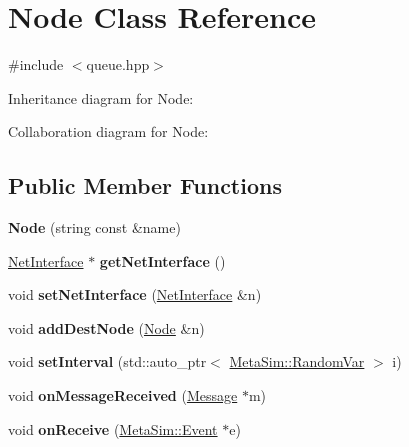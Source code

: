 \hypertarget{classNode}{}\section{Node Class Reference}
\label{classNode}


{\ttfamily \#include $<$queue.\+hpp$>$}



Inheritance diagram for Node\+:


Collaboration diagram for Node\+:
\subsection*{Public Member Functions}
\begin{DoxyCompactItemize}
\item 
{\bfseries Node} (string const \&name)\hypertarget{classNode_a63d040cf5e69258d36138057131e6223}{}\label{classNode_a63d040cf5e69258d36138057131e6223}

\item 
\hyperlink{classNetInterface}{Net\+Interface} $\ast$ {\bfseries get\+Net\+Interface} ()\hypertarget{classNode_a367cc1b357667e0517259a5955fed5d4}{}\label{classNode_a367cc1b357667e0517259a5955fed5d4}

\item 
void {\bfseries set\+Net\+Interface} (\hyperlink{classNetInterface}{Net\+Interface} \&n)\hypertarget{classNode_ad764157ae91279ab80f272f6f2849827}{}\label{classNode_ad764157ae91279ab80f272f6f2849827}

\item 
void {\bfseries add\+Dest\+Node} (\hyperlink{classNode}{Node} \&n)\hypertarget{classNode_aa9ca13bfe768dc01f64a0512345224d8}{}\label{classNode_aa9ca13bfe768dc01f64a0512345224d8}

\item 
void {\bfseries set\+Interval} (std\+::auto\+\_\+ptr$<$ \hyperlink{classMetaSim_1_1RandomVar}{Meta\+Sim\+::\+Random\+Var} $>$ i)\hypertarget{classNode_a373a4311166dcc21eeae3cb68d87d02e}{}\label{classNode_a373a4311166dcc21eeae3cb68d87d02e}

\item 
void {\bfseries on\+Message\+Received} (\hyperlink{classMessage}{Message} $\ast$m)\hypertarget{classNode_aed0195e31166074c37aa64b8acf39d0c}{}\label{classNode_aed0195e31166074c37aa64b8acf39d0c}

\item 
void {\bfseries on\+Receive} (\hyperlink{classMetaSim_1_1Event}{Meta\+Sim\+::\+Event} $\ast$e)\hypertarget{classNode_a7099e1ad3fdd0737334243452aeed394}{}\label{classNode_a7099e1ad3fdd0737334243452aeed394}


\end{DoxyCompactItemize}
